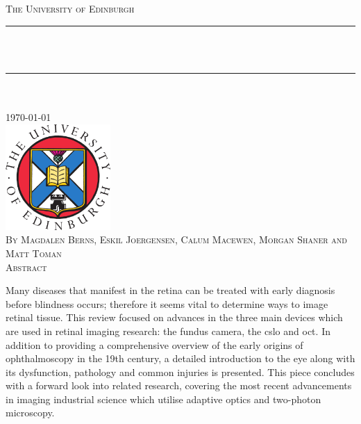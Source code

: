 \documentclass[11pt, a4paper, oneside]{Thesis}
\title{\ttitle}
\begin{document}
\frontmatter %
\fancyhead{} %
\rhead{\thepage} %
\lhead{} %
\pagestyle{fancy}
\newcommand{\HRule}{\rule{\linewidth}{0.5mm}} %




\begin{titlepage}
\begin{center}

\textsc{\LARGE The University of Edinburgh}\\[1.5cm]
\HRule \\[0.8cm] %

\textsc{\huge \ttitle }\\[0.2cm]
\HRule \\[0.5cm] %
\textsc{\Large \deptname}\\[1.0cm]

\large \today \\[1cm]

\includegraphics[width=4.0cm]{logo}\\[1cm]

\textsc{\small By Magdalen Berns, Eskil Joergensen, Calum Macewen, Morgan Shaner and Matt Toman} \\[1cm]

\textsc{\Large{Abstract}}\\
\end{center}

Many diseases that manifest in the retina can be treated with early diagnosis before
blindness occurs; therefore it seems vital to determine ways to image retinal tissue.
This review focused on advances in the three main devices which are used in retinal
imaging research: the fundus camera, the \Gls{cslo} and \Gls{oct}. In addition to
providing a comprehensive overview of the early origins of ophthalmoscopy in the 19th
century, a detailed introduction to the eye along with its dysfunction, pathology and
common injuries is presented. This piece concludes with a forward look into related
research, covering the most recent advancements in imaging industrial science which
utilise adaptive optics and two-photon microscopy.

\end{titlepage}
\end{document}
